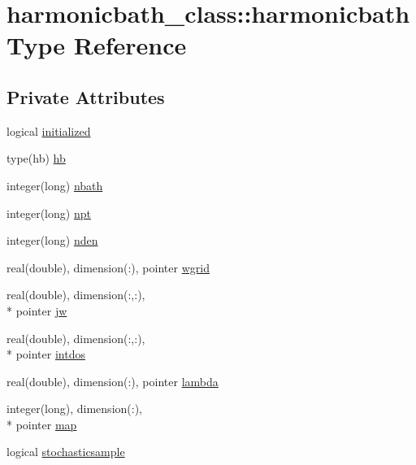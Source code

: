\hypertarget{structharmonicbath__class_1_1harmonicbath}{\section{harmonicbath\-\_\-class\-:\-:harmonicbath Type Reference}
\label{structharmonicbath__class_1_1harmonicbath}
}
\subsection*{Private Attributes}
\begin{DoxyCompactItemize}
\item 
logical \hyperlink{structharmonicbath__class_1_1harmonicbath_a876fbdf98da8f3bfeb4b4e03b58d6f74}{initialized}
\item 
type(hb) \hyperlink{structharmonicbath__class_1_1harmonicbath_a7b59e71a4b2100f821d091a5193d50f5}{hb}
\item 
integer(long) \hyperlink{structharmonicbath__class_1_1harmonicbath_ad55e02fae968c36f82bcfa4faf61d978}{nbath}
\item 
integer(long) \hyperlink{structharmonicbath__class_1_1harmonicbath_ab292a58613813f3ee812f949f9899089}{npt}
\item 
integer(long) \hyperlink{structharmonicbath__class_1_1harmonicbath_a87afd4834fce3bda38f7c49ecb203121}{nden}
\item 
real(double), dimension(\-:), pointer \hyperlink{structharmonicbath__class_1_1harmonicbath_a4268e843792e21ac9c78224a9e540e1f}{wgrid}
\item 
real(double), dimension(\-:,\-:), \\*
pointer \hyperlink{structharmonicbath__class_1_1harmonicbath_a5d4365532fe5feb53eb8bf06a64c8bcc}{jw}
\item 
real(double), dimension(\-:,\-:), \\*
pointer \hyperlink{structharmonicbath__class_1_1harmonicbath_aded5880e44b831dddae5be30966594e4}{intdos}
\item 
real(double), dimension(\-:), pointer \hyperlink{structharmonicbath__class_1_1harmonicbath_abdcf7e97525bd1bd424af202df2c5253}{lambda}
\item 
integer(long), dimension(\-:), \\*
pointer \hyperlink{structharmonicbath__class_1_1harmonicbath_a080d6ce6fdb6481bb8851b4fbc24a995}{map}
\item 
logical \hyperlink{structharmonicbath__class_1_1harmonicbath_a1ae24e6ddcc5e0a0b80decc16a0865cb}{stochasticsample}
\end{DoxyCompactItemize}


